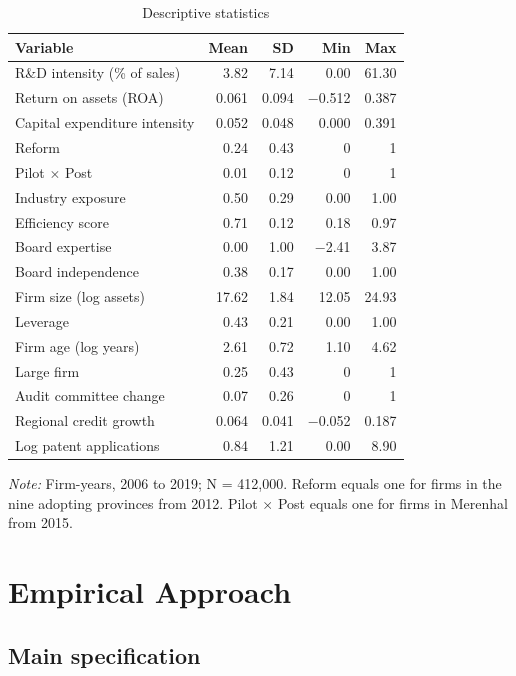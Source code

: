 \documentclass[12pt]{article}
\newcommand{\tabnote}[1]{\par\vspace{2pt}\begin{minipage}{\linewidth}\footnotesize\setstretch{1.0}\textit{Note:} #1\end{minipage}}
\begin{document}
\begin{table}[!htbp]
\centering
\begin{threeparttable}
\caption{Descriptive statistics}
\small
{}
\begin{tabular}{lrrrr}
\toprule
Variable & Mean & SD & Min & Max \\
\midrule
R\&D intensity (\% of sales) & 3.82 & 7.14 & 0.00 & 61.30 \\
Return on assets (ROA) & 0.061 & 0.094 & $-$0.512 & 0.387 \\
Capital expenditure intensity & 0.052 & 0.048 & 0.000 & 0.391 \\
Reform & 0.24 & 0.43 & 0 & 1 \\
Pilot $\times$ Post & 0.01 & 0.12 & 0 & 1 \\
Industry exposure & 0.50 & 0.29 & 0.00 & 1.00 \\
Efficiency score & 0.71 & 0.12 & 0.18 & 0.97 \\
Board expertise & 0.00 & 1.00 & $-$2.41 & 3.87 \\
Board independence & 0.38 & 0.17 & 0.00 & 1.00 \\
Firm size (log assets) & 17.62 & 1.84 & 12.05 & 24.93 \\
Leverage & 0.43 & 0.21 & 0.00 & 1.00 \\
Firm age (log years) & 2.61 & 0.72 & 1.10 & 4.62 \\
Large firm & 0.25 & 0.43 & 0 & 1 \\
Audit committee change & 0.07 & 0.26 & 0 & 1 \\
Regional credit growth & 0.064 & 0.041 & $-$0.052 & 0.187 \\
Log patent applications & 0.84 & 1.21 & 0.00 & 8.90 \\
\bottomrule
\end{tabular}
\tabnote{Firm-years, 2006 to 2019; N = 412,000. Reform equals one for firms in the nine adopting provinces from 2012. Pilot $\times$ Post equals one for firms in Merenhal from 2015.}
\end{threeparttable}
\end{table}

\section{Empirical Approach}

\subsection{Main specification}
\end{document}
